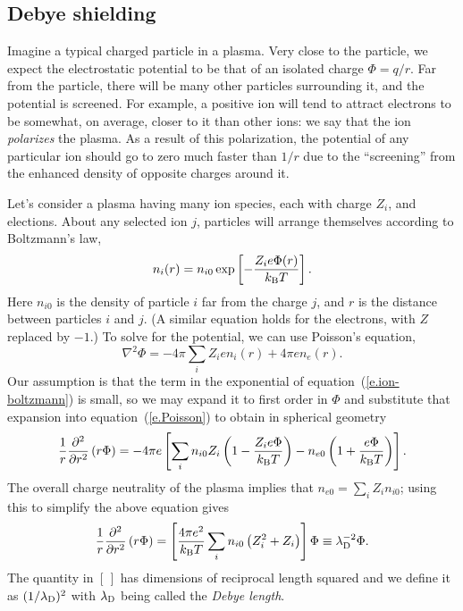 \subsection{Debye shielding}\label{s.plasma-shielding}

Imagine a typical charged particle in a plasma.  Very close to the particle, we expect the electrostatic potential to be that of an isolated charge $\Phi = q/r$. Far from the particle, there will be many other particles surrounding it, and the potential is screened. For example, a positive ion will tend to attract electrons to be somewhat, on average, closer to it than other ions: we say that the ion \emph{polarizes} the plasma.  As a result of this polarization, the potential of any particular ion should go to zero much faster than $1/r$ due to the ``screening'' from the enhanced density of opposite charges around it.

Let's consider a plasma having many ion species, each with charge $Z_{i}$, and elections. About any selected ion $j$,  particles will arrange themselves according to Boltzmann's law,
\begin{equation}\label{e.ion-boltzmann}
n_{i}(r) = n_{i0}\exp\left[-\frac{Z_{i}e\Phi(r)}{k_\mathrm{B} T}\right].
\end{equation}
Here $n_{i0}$ is the density of particle $i$ far from the charge $j$, and $r$ is the distance between particles $i$ and $j$.  (A similar equation holds for the electrons, with $Z$ replaced by $-1$.) To solve for the potential, we can use Poisson's equation,
\begin{equation}\label{e.Poisson}
\nabla^{2}\Phi = -4\pi \sum_{i} Z_{i}e n_{i}(r) +4\pi e n_{e}(r).
\end{equation}
Our assumption is that the term in the exponential of equation~(\ref{e.ion-boltzmann}) is small, so we may expand it to first order in $\Phi$ and substitute that expansion into equation~(\ref{e.Poisson}) to obtain in spherical geometry
\[
 \frac{1}{r}\frac{\partial^{2}}{\partial r^{2}}\left(r\Phi\right) = -4\pi e \left[\sum_{i} n_{i0}Z_{i}\left(1-\frac{Z_{i}e\Phi}{k_\mathrm{B} T}\right) - n_{e0}\left(1 + \frac{e\Phi}{k_\mathrm{B} T}\right)\right].
\]
The overall charge neutrality of the plasma implies that $n_{e0} = \sum_{i}Z_{i}n_{i0}$; using this to simplify the above equation gives
\begin{equation}\label{e.linearized-Poisson}
\frac{1}{r}\frac{\partial^{2}}{\partial r^{2}}\left(r\Phi\right) = \left[\frac{4\pi e^{2}}{k_\mathrm{B} T}\sum_{i} n_{i0}\left(Z_{i}^{2}+Z_{i}\right)\right]\Phi \equiv \lambda_{\mathrm{D}}^{-2}\Phi.
\end{equation}
The quantity in $[\, ]$ has dimensions of reciprocal length squared and we define it as $(1/\lambda_{\mathrm{D}})^{2}$ with $\lambda_{\mathrm{D}}$ being called the \emph{Debye length}.

